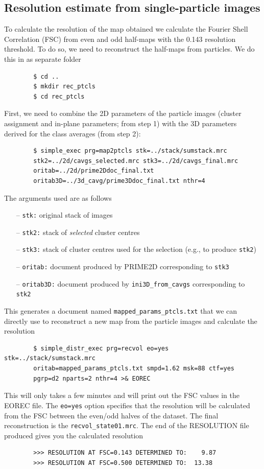 \documentclass[a4paper,11pt]{article}
\newcommand{\prgname}[1]{\textcolor{NavyBlue}{\texttt{#1}}}
\begin{document}
\subsection{Resolution estimate from single-particle images}
To calculate the resolution of the map obtained we calculate the Fourier Shell Correlation (FSC) from even and odd half-maps with the 0.143 resolution threshold. To do so, we need to reconstruct the half-maps from particles. We do this in as separate folder
\begin{verbatim}
        $ cd ..
        $ mkdir rec_ptcls
        $ cd rec_ptcls
\end{verbatim}
First, we need to combine the 2D parameters of the particle images (cluster assignment and in-plane parameters; from step 1) with the 3D parameters derived for the class averages (from step 2):
\begin{verbatim}
        $ simple_exec prg=map2ptcls stk=../stack/sumstack.mrc
        stk2=../2d/cavgs_selected.mrc stk3=../2d/cavgs_final.mrc
        oritab=../2d/prime2Ddoc_final.txt 
        oritab3D=../3d_cavg/prime3Ddoc_final.txt nthr=4
\end{verbatim}
\noindent{}The arguments used are as follows
\begin{itemize}
\item[--] \texttt{stk:} original stack of images
\item[--] \texttt{stk2:} stack of \textit{selected} cluster centres
\item[--] \texttt{stk3:} stack of cluster centres used for the selection (e.g., to produce \texttt{stk2})
\item[--] \texttt{oritab:} document produced by PRIME2D corresponding to \texttt{stk3}
\item[--] \texttt{oritab3D:} document produced by \prgname{ini3D\_from\_cavgs} corresponding to \texttt{stk2}
\end{itemize}
This generates a document named \texttt{mapped\_params\_ptcls.txt} that we can directly use to reconstruct a new map from the particle images and calculate the resolution
\begin{verbatim}
        $ simple_distr_exec prg=recvol eo=yes stk=../stack/sumstack.mrc 
        oritab=mapped_params_ptcls.txt smpd=1.62 msk=88 ctf=yes 
        pgrp=d2 nparts=2 nthr=4 >& EOREC
\end{verbatim}
This will only takes a few minutes and will print out the FSC values in the EOREC file. The \texttt{eo=yes} option specifies that the resolution will be calculated from the FSC between the even/odd halves of the dataset. The final reconstruction is the \texttt{recvol\_state01.mrc}. The end of the RESOLUTION file produced gives you the calculated resolution
\begin{verbatim}
        >>> RESOLUTION AT FSC=0.143 DETERMINED TO:    9.87
        >>> RESOLUTION AT FSC=0.500 DETERMINED TO:  13.38
\end{verbatim}


\end{document}
